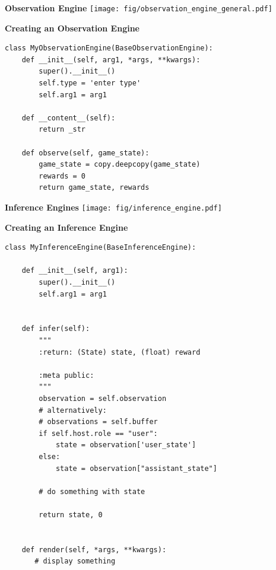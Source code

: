\documentclass[11pt, xcolor = {dvipsnames}]{beamer}
\begin{document}
\begin{frame}{\textbf{Observation Engine}}
\centering
\texttt{[image: fig/observation\_engine\_general.pdf]} 
\end{frame}

\begin{frame}[fragile]{\textbf{Creating an Observation Engine}}
\begin{adjustbox}{height=.4\textheight}\lstset{language=Python}
\lstset{frame=lines}
\lstset{basicstyle=\footnotesize}
\begin{lstlisting}
class MyObservationEngine(BaseObservationEngine):
    def __init__(self, arg1, *args, **kwargs):
        super().__init__()
        self.type = 'enter type'
        self.arg1 = arg1

    def __content__(self):
        return _str

    def observe(self, game_state):
        game_state = copy.deepcopy(game_state)
        rewards = 0
        return game_state, rewards
\end{lstlisting}
\end{adjustbox}
\end{frame}

\begin{frame}{\textbf{Inference Engines}}
\centering
\texttt{[image: fig/inference\_engine.pdf]} 
\end{frame}


\begin{frame}[fragile]{\textbf{Creating an Inference Engine}}
\begin{adjustbox}{height=.4\textheight}\lstset{language=Python}
\lstset{frame=lines}
\lstset{basicstyle=\footnotesize}
\begin{lstlisting}
class MyInferenceEngine(BaseInferenceEngine):
    
    def __init__(self, arg1):
        super().__init__()
        self.arg1 = arg1


    def infer(self):
        """
        :return: (State) state, (float) reward

        :meta public:
        """
        observation = self.observation
        # alternatively:
        # observations = self.buffer
        if self.host.role == "user":
            state = observation['user_state']
        else:
            state = observation["assistant_state"]

        # do something with state

        return state, 0


    def render(self, *args, **kwargs):
       # display something
\end{lstlisting}
\end{adjustbox}
\end{frame}
\end{document}
